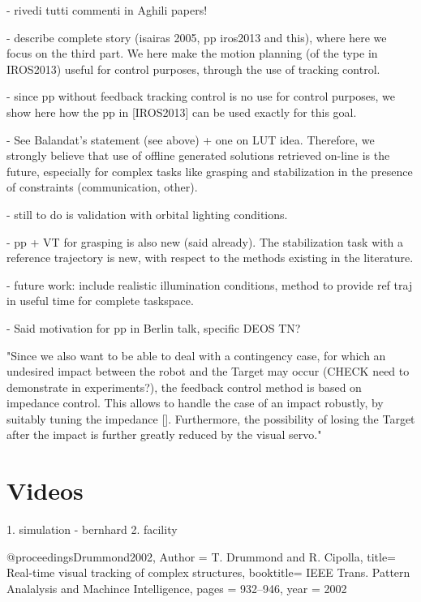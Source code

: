 - rivedi tutti commenti in Aghili papers!

- describe complete story (isairas 2005, pp iros2013 and this), where here we focus on the third part. We here make the motion planning (of the type in IROS2013) useful for control purposes, through the use of tracking control.

- since pp without feedback tracking control is no use for control purposes, we show here how the pp in [IROS2013] can be used exactly for this goal.

- See Balandat's statement (see above) + one on LUT idea. Therefore, we strongly believe that use of offline generated solutions retrieved on-line is the future, especially for complex tasks like grasping and stabilization in the presence of constraints (communication, other).

- still to do is validation with orbital lighting conditions.

- pp + VT for grasping is also new (said already). The stabilization task with a reference trajectory is new, with respect to the methods existing in the literature. 

- future work: include realistic illumination conditions, method to provide ref traj in useful time for complete taskspace.

- Said motivation for pp in Berlin talk, specific DEOS TN?

"Since we also want to be able to deal with a contingency case, for which an undesired impact between the robot and the Target may occur (CHECK need to demonstrate in experiments?), the feedback control method is based on impedance control. This allows to handle the case of an impact robustly, by suitably tuning the impedance []. Furthermore, the possibility of losing the Target after the impact is further greatly reduced by the visual servo."


%
\section{Videos}
1. simulation - bernhard
2. facility

%

@proceedings{Drummond2002,
Author = {T. Drummond and R. Cipolla},
title=  {Real-time visual tracking of complex structures},
booktitle= {IEEE Trans. Pattern Analalysis and Machince Intelligence},
pages = {932--946},
year = {2002}
}

